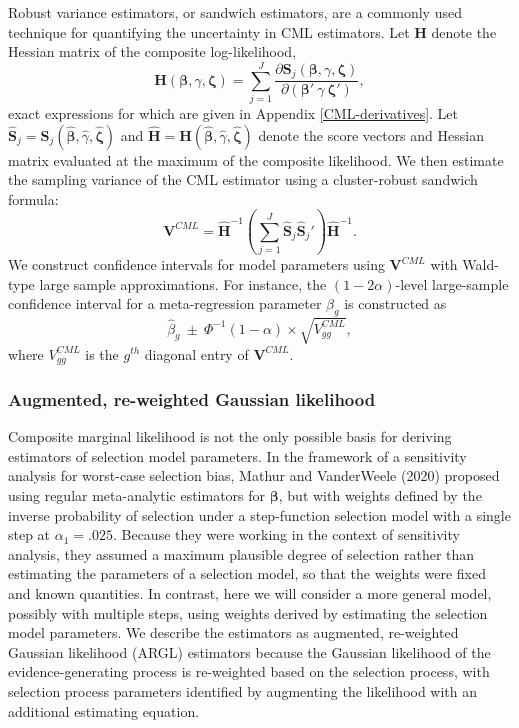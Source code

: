 \documentclass[
  man, donotrepeattitle,floatsintext]{apa7}
\begin{document}
Robust variance estimators, or sandwich estimators, are a commonly used technique for quantifying the uncertainty in CML estimators. Let \(\mathbf{H}\) denote the Hessian matrix of the composite log-likelihood,
\begin{equation}
\mathbf{H}(\boldsymbol\beta, \gamma, \boldsymbol\zeta) = \sum_{j=1}^J \frac{\partial \mathbf{S}_j(\boldsymbol\beta, \gamma, \boldsymbol\zeta)}{\partial \left(\boldsymbol\beta' \ \gamma \ \boldsymbol\zeta'\right)},
\end{equation}
exact expressions for which are given in Appendix \ref{CML-derivatives}.
Let \(\mathbf{\hat{S}}_j = \mathbf{S}_j(\boldsymbol{\hat\beta}, \hat\gamma, \boldsymbol{\hat\zeta})\) and \(\mathbf{\hat{H}} = \mathbf{H}(\boldsymbol{\hat\beta}, \hat\gamma, \boldsymbol{\hat\zeta})\) denote the score vectors and Hessian matrix evaluated at the maximum of the composite likelihood.
We then estimate the sampling variance of the CML estimator using a cluster-robust sandwich formula:
\begin{equation}
\label{eq:sandwich-variance}
\mathbf{V}^{CML} = \mathbf{\hat{H}}^{-1}\left(\sum_{j=1}^J \mathbf{\hat{S}}_j {\mathbf{\hat{S}}_j}'\right) \mathbf{\hat{H}}^{-1}.
\end{equation}
We construct confidence intervals for model parameters using \(\mathbf{V}^{CML}\) with Wald-type large sample approximations. For instance, the \((1 - 2\alpha)\)-level large-sample confidence interval for a meta-regression parameter \(\beta_g\) is constructed as
\[
\hat\beta_g \ \pm \ \Phi^{-1}(1 - \alpha) \times \sqrt{V^{CML}_{gg}},
\]
where \(V^{CML}_{gg}\) is the \(g^{th}\) diagonal entry of \(\mathbf{V}^{CML}\).

\subsubsection{Augmented, re-weighted Gaussian likelihood}\label{augmented-re-weighted-gaussian-likelihood}

Composite marginal likelihood is not the only possible basis for deriving estimators of selection model parameters.
In the framework of a sensitivity analysis for worst-case selection bias, Mathur and VanderWeele (2020) proposed using regular meta-analytic estimators for \(\boldsymbol\beta\), but with weights defined by the inverse probability of selection under a step-function selection model with a single step at \(\alpha_1 = .025\).
Because they were working in the context of sensitivity analysis, they assumed a maximum plausible degree of selection rather than estimating the parameters of a selection model, so that the weights were fixed and known quantities.
In contrast, here we will consider a more general model, possibly with multiple steps, using weights derived by estimating the selection model parameters.
We describe the estimators as augmented, re-weighted Gaussian likelihood (ARGL) estimators because the Gaussian likelihood of the evidence-generating process is re-weighted based on the selection process, with selection process parameters identified by augmenting the likelihood with an additional estimating equation.
\end{document}

